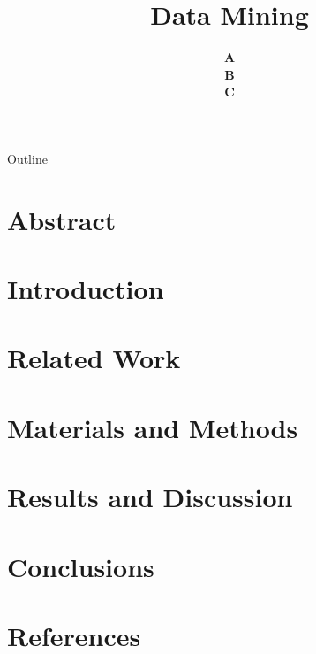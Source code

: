 \documentclass[9pt]{beamer}
\title[Beamer Name]{Data Mining} %
\author[A,B,C]{ \textbf{\Large A\\ B\\ C}} %
\institute[SEMO]{\large UNIVERSITY}
\date{}
\begin{document}
\frame[plain]{\titlepage}


\begin{frame}{Outline}
  \tableofcontents
\end{frame}

\section{Abstract}
    
\section{Introduction}
    
\section{Related Work}
    
\section{Materials and Methods}
    
\section{Results and Discussion}
    
\section{Conclusions}
    
\section{References}
    
\end{document}
